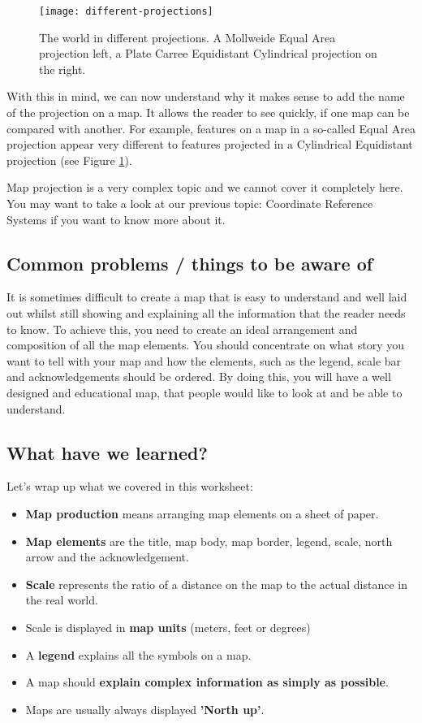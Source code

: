 \begin{figure}[ht]
   \begin{center}
   \caption{The world in different projections. A Mollweide Equal Area
projection left, a Plate Carree Equidistant Cylindrical projection on the
right.}
\label{fig:diffprojs}\smallskip
   \texttt{[image: different-projections]}
\end{center}
\end{figure}

With this in mind, we can now understand why it makes sense to add the name
of the projection on a map. It allows the reader to see quickly, if one map
can be compared with another. For example, features on a map in a so-called
Equal Area projection appear very different to features projected in a
Cylindrical Equidistant projection (see Figure \ref{fig:diffprojs}). 
    
Map projection is a very complex topic and we cannot cover it completely
here. You may want to take a look at our previous topic: Coordinate Reference
Systems if you want to know more about it.

\subsection{Common problems / things to be aware of}

It is sometimes difficult to create a map that is easy to understand and well
laid out whilst still showing and explaining all the information that the
reader needs to know. To achieve this, you need to create an ideal
arrangement and composition of all the map elements. You should concentrate
on what story you want to tell with your map and how the elements, such as
the legend, scale bar and acknowledgements should be ordered. By doing this,
you will have a well designed and educational map, that people would like to
look at and be able to understand.  

\subsection{What have we learned?}

Let's wrap up what we covered in this worksheet:

\begin{itemize}
\item \textbf{Map production} means arranging map elements on a sheet of paper.
\item \textbf{Map elements} are the title, map body, map border, legend,
scale, north arrow and the acknowledgement.
\item \textbf{Scale} represents the ratio of a distance on the map to the
actual distance in the real world.
\item Scale is displayed in \textbf{map units} (meters, feet or degrees)
\item A \textbf{legend} explains all the symbols on a map.
\item A map should \textbf{explain complex information as simply as possible}. 
\item Maps are usually always displayed \textbf{'North up'}.
\end{itemize}

